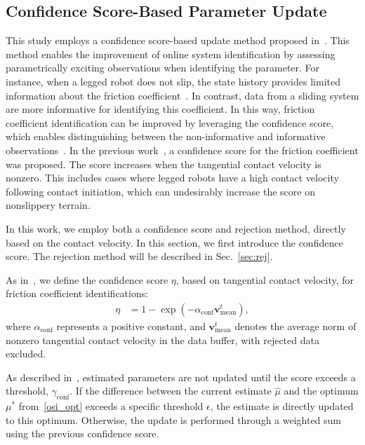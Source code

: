 \subsection{Confidence Score-Based Parameter Update}
\label{sec:conf}
This study employs a confidence score-based update method proposed in~\cite{chen2022real}. This method enables the improvement of online system identification by assessing parametrically exciting observations when identifying the parameter. For instance, when a legged robot does not slip, the state history provides limited information about the friction coefficient~\cite{focchi2018slip}. In contrast, data from a sliding system are more informative for identifying this coefficient.
In this way, friction coefficient identification can be improved by leveraging the confidence score, which enables distinguishing between the non-informative and informative observations~\cite{chen2022real}. In the previous work~\cite{chen2022realarxiv}, a confidence score for the friction coefficient was proposed. The score increases when the tangential contact velocity is nonzero. This includes cases where legged robots have a high contact velocity following contact initiation, which can undesirably increase the score on nonslippery terrain.

In this work, we employ both a confidence score and rejection method, directly based on the contact velocity. In this section, we first introduce the confidence score. The rejection method will be described in Sec.~\ref{sec:rej}.

As in~\cite{chen2022realarxiv}, we define the confidence score $\eta$, based on tangential contact velocity, for friction coefficient identifications:
\begin{align}
\label{eq:confidence_score}
\eta &= 1-\exp(-\alpha_\mathrm{conf}\mathbf{v}^{t}_\text{mean}),
\end{align}
where $\alpha_\mathrm{conf}$ represents a positive constant, and $\mathbf{v}^{t}_\text{mean}$ denotes the average norm of nonzero tangential contact velocity in the data buffer, with rejected data excluded.

As described in~\cite{chen2022real}, estimated parameters are not updated until the score exceeds a threshold, $\gamma_\mathrm{conf}$. If the difference between the current estimate $\hat{\mu}$ and the optimum $\mu^{*}$ from~\eqref{osi_opt} exceeds a specific threshold $\epsilon$, the estimate is directly updated to this optimum. Otherwise, the update is performed through a weighted sum using the previous confidence score.

